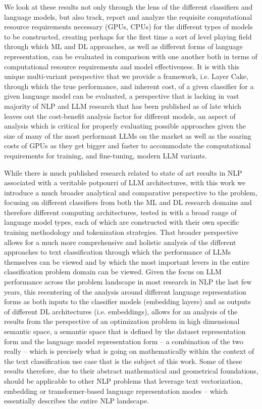 \documentclass[final]{clv2025}
\begin{document}
We look at these results not only through the lens of the different classifiers and language models, but also track, report and analyze the requisite computational resource requirements necessary (GPUs, CPUs) for the different types of models to be constructed, creating perhaps for the first time a sort of level playing field through which ML and DL approaches, as well as different forms of language representation, can be evaluated in comparison with one another both in terms of computational resource requirements and model effectiveness. It is with this unique multi-variant perspective that we provide a framework, i.e. Layer Cake, through which the true performance, and inherent cost, of a given classifier for a given language model can be evaluated, a perspective that is lacking in vast majority of NLP and LLM research that has been published as of late which leaves out the cost-benefit analysis factor for different models, an aspect of analysis which is critical for properly evaluating possible approaches given the size of many of the most performant LLMs on the market as well as the soaring costs of GPUs as they get bigger and faster to accommodate the computational requirements for training, and fine-tuning, modern LLM variants.

While there is much published research related to state of art results in NLP associated with a veritable potpourri of LLM architectures, with this work we introduce a much broader analytical and comparative perspective to the problem, focusing on different classifiers from both the ML and DL research domains and therefore different computing architectures, tested in with a broad range of language model types, each of which are constructed with their own specific training methodology and tokenization strategies. That broader perspective allows for a much more comprehensive and holistic analysis of the different approaches to text classification through which the performance of LLMs themselves can be viewed and by which the most important levers in the entire classification problem domain can be viewed. Given the focus on LLM performance across the problem landscape in most research in NLP the last few years, this recentering of the analysis around different language representation forms as both inputs to the classifier models (embedding layers) and as outputs of different DL architectures (i.e. embeddings), allows for an analysis of the results from the perspective of an optimization problem in high dimensional semantic space, a semantic space that is defined by the dataset representation form and the language model representation form – a combination of the two really – which is precisely what is going on mathematically within the context of the text classification use case that is the subject of this work. Some of these results therefore, due to their abstract mathematical and geometrical foundations, should be applicable to other NLP problems that leverage text vectorization, embedding or transformer-based language representation modes – which essentially describes the entire NLP landscape.
\end{document}
